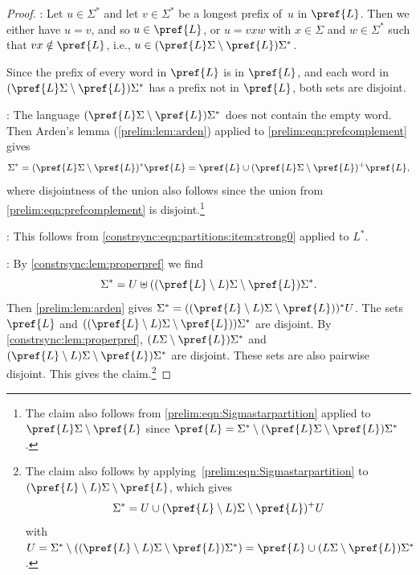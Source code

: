 \begin{proof}
\underline{}: Let $u \in \Sigma^*$ and 
let $v \in \Sigma^*$ be a longest prefix of~$u$
in $\pref{L}$. Then we either have $u = v$, and so $u \in \pref{L}$,
or $u = vxw$ with $x \in \Sigma$ and $w \in \Sigma^*$
such that $vx \notin \pref{L}$, i.e.,
$u \in ( \pref{L}\Sigma \setminus \pref{L} ) \Sigma^*$.

Since the prefix of every word in $\pref{L}$
is in $\pref{L}$, and each word in $( \pref{L}\Sigma \setminus \pref{L} ) \Sigma^*$
has a prefix not in $\pref{L}$, both sets are disjoint.

\underline{}:
The language $( \pref{L}\Sigma \setminus \pref{L} ) \Sigma^*$
does not contain the empty word.
Then Arden's lemma (\cref{prelim:lem:arden}) applied to \cref{prelim:eqn:prefcomplement}
gives 
\[
\Sigma^* = ( \pref{L}\Sigma \setminus \pref{L} )^* \pref{L}
= \pref{L} \cup ( \pref{L}\Sigma \setminus \pref{L} )^+ \pref{L},
\]
where disjointness of the union also follows since the union from \cref{prelim:eqn:prefcomplement} 
is disjoint.\footnote{The claim also follows from \cref{prelim:eqn:Sigmastarpartition}
applied to $\pref{L}\Sigma \setminus \pref{L}$
since $\pref{L} = \Sigma^* \setminus ( \pref{L}\Sigma \setminus \pref{L} )\Sigma^*$.}

\underline{}: This follows
from \cref{constrsync:eqn:partitions:item:strong0} applied to $L^*$.

\underline{}: 
By \cref{constrsync:lem:properpref} we find
\[
\Sigma^* = U  \uplus ( (\pref{L} \setminus L)\Sigma \setminus \pref{L} )\Sigma^*.
\]
Then \cref{prelim:lem:arden} gives $\Sigma^* = (  ( \pref{L} \setminus L )\Sigma \setminus \pref{L} ) )^* U$.
The sets $\pref{L}$ and $(  ( \pref{L} \setminus L )\Sigma \setminus \pref{L} ) ) \Sigma^*$
are disjoint. By \cref{constrsync:lem:properpref}, 
$(L\Sigma \setminus \pref{L})\Sigma^*$
and $(\pref{L} \setminus L)\Sigma \setminus \pref{L} )\Sigma^*$
are disjoint. These sets are also pairwise disjoint. This gives the claim.\footnote{The claim also follows by applying~\cref{prelim:eqn:Sigmastarpartition} to $( \pref{L} \setminus L )\Sigma \setminus \pref{L}$,
	which gives
	\[
	\Sigma^* = U \cup ( \pref{L} \setminus L )\Sigma \setminus \pref{L} )^+  U
	\]
	with $U = \Sigma^* \setminus ( ( \pref{L} \setminus L )\Sigma \setminus \pref{L} )\Sigma^* ) = \pref{L} \cup ( L\Sigma \setminus \pref{L} ) \Sigma^*$.}
\end{proof}

